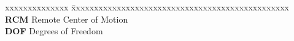 \documentclass[BTech]{iitmdiss}
\begin{document}
    \pagebreak



    \begin{singlespace}
        \tableofcontents
        \thispagestyle{empty}

        \listoftables
        \listoffigures
    \end{singlespace}


    \newpage
    \begin{tabbing}

    \end{tabbing}
    \abbreviations

    \noindent
    \begin{tabbing}
        xxxxxxxxxxxxxx \= xxxxxxxxxxxxxxxxxxxxxxxxxxxxxxxxxxxxxxxxxxxxxxxx \kill
        \textbf{RCM} \> Remote Center of Motion\\
        \textbf{DOF} \> Degrees of Freedom\\

    \end{tabbing}

    \pagebreak

%
%
%
%



\end{document}
